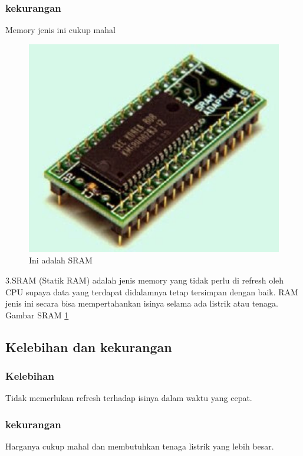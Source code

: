     \subsubsection{kekurangan}
    \-Memory jenis ini cukup mahal

  \begin{figure}[ht]
  \centerline{\includegraphics[width=1\textwidth]{figures/SRAM.jpg}}
  \caption{Ini adalah SRAM}
  \label{SRAM}
  \end{figure}

3.SRAM (Statik RAM) adalah jenis memory yang tidak perlu di refresh oleh CPU supaya data yang terdapat didalamnya tetap tersimpan dengan baik.
RAM jenis ini secara bisa mempertahankan isinya selama ada listrik atau tenaga.
Gambar SRAM \ref{SRAM}
  \subsection{Kelebihan dan kekurangan}
    \subsubsection{Kelebihan}
    \-Tidak memerlukan refresh terhadap isinya dalam waktu yang cepat.
    \subsubsection{kekurangan}
    \-Harganya cukup mahal dan membutuhkan tenaga listrik yang lebih besar.

